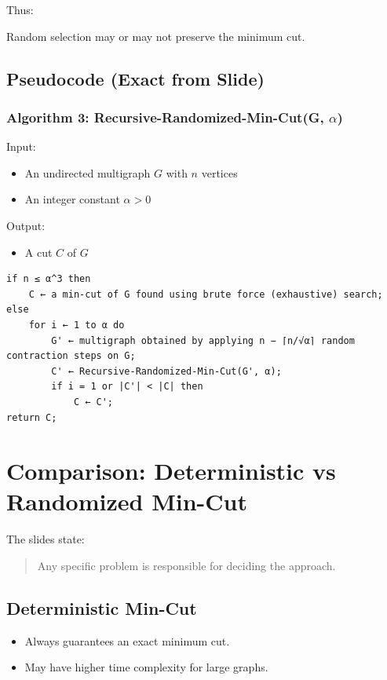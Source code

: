 \documentclass[12pt]{article}
\begin{document}
Thus:

Random selection may or may not preserve the minimum cut.

\subsection{Pseudocode (Exact from Slide)}

\subsubsection*{Algorithm 3: Recursive-Randomized-Min-Cut(G, $\alpha$)}

Input:
\begin{itemize}
    \item An undirected multigraph $G$ with $n$ vertices
    \item An integer constant $\alpha > 0$
\end{itemize}

Output:
\begin{itemize}
    \item A cut $C$ of $G$
\end{itemize}

\begin{verbatim}
if n ≤ α^3 then
    C ← a min-cut of G found using brute force (exhaustive) search;
else
    for i ← 1 to α do
        G' ← multigraph obtained by applying n − ⌈n/√α⌉ random contraction steps on G;
        C' ← Recursive-Randomized-Min-Cut(G', α);
        if i = 1 or |C'| < |C| then
            C ← C';
return C;
\end{verbatim}

\section{Comparison: Deterministic vs Randomized Min-Cut}

The slides state:

\begin{quote}
Any specific problem is responsible for deciding the approach.
\end{quote}

\subsection*{Deterministic Min-Cut}

\begin{itemize}
    \item Always guarantees an exact minimum cut.
    \item May have higher time complexity for large graphs.
\end{itemize}
\end{document}
